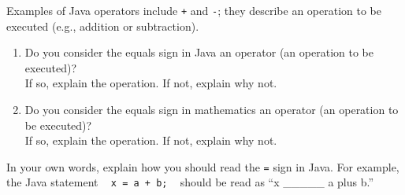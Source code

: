 \Q Examples of Java operators include \texttt{+} and \texttt{-}; they describe an operation to be executed (e.g., addition or subtraction).

\begin{enumerate}
\item Do you consider the equals sign in Java an operator (an operation to be executed)?
\\ If so, explain the operation. If not, explain why not.

\item Do you consider the equals sign in mathematics an operator (an operation to be executed)?
\\ If so, explain the operation. If not, explain why not.
\end{enumerate}


\Q In your own words, explain how you should read the \texttt{=} sign in Java.
For example, the Java statement ~ \texttt{x = a + b;} ~ should be read as ``x \_\_\_\_\_ a plus b.''

\begin{answer}
\end{answer}
